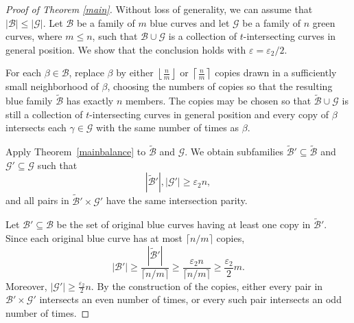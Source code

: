 \documentclass[11pt]{article}
\theoremstyle{plain}
\theoremstyle{definition}
\theoremstyle{remark}
\begin{document}
\begin{proof}[Proof of Theorem \ref{main}]

Without loss of generality, we can assume that $|\mathcal B| \leq |\mathcal G|$.  Let \(\mathcal B\) be a family of \(m\) blue curves and let
\(\mathcal G\) be a family of \(n\) green curves, where \(m\leq n\), such that
\(\mathcal B\cup\mathcal G\) is a collection of \(t\)-intersecting curves in
general position. We show that the conclusion holds with
\(\varepsilon=\varepsilon_2/2\).

For each \(\beta\in\mathcal B\), replace \(\beta\) by either $\left\lfloor \frac{n}{m}\right\rfloor$ or $\left\lceil \frac{n}{m}\right\rceil$ copies drawn in a sufficiently small neighborhood of \(\beta\), choosing the numbers of copies
so that the resulting blue family \(\widetilde{\mathcal B}\) has exactly
\(n\) members. The copies may be chosen so that
\(\widetilde{\mathcal B}\cup\mathcal G\) is still a collection of
\(t\)-intersecting curves in general position and every copy of \(\beta\)
intersects each \(\gamma\in\mathcal G\) with the same number of times as \(\beta\).

Apply Theorem~\ref{mainbalance} to
\(\widetilde{\mathcal B}\) and \(\mathcal G\). We obtain subfamilies
\(\widetilde{\mathcal B}'\subseteq\widetilde{\mathcal B}\) and
\(\mathcal G'\subseteq\mathcal G\) such that
\[
|\widetilde{\mathcal B}'|,|\mathcal G'|\ge \varepsilon_2 n,
\]
and all pairs in
\(\widetilde{\mathcal B}'\times\mathcal G'\) have the same intersection
parity.

Let \(\mathcal B'\subseteq\mathcal B\) be the set of original blue curves
having at least one copy in \(\widetilde{\mathcal B}'\). Since each original
blue curve has at most \(\lceil n/m\rceil\) copies,
\[
|\mathcal B'|
\ge
\frac{|\widetilde{\mathcal B}'|}{\lceil n/m\rceil}
\ge
\frac{\varepsilon_2 n}{\lceil n/m\rceil} \geq \frac{\varepsilon_2}{2}m.
\]
Moreover, $|\mathcal G'|\ge  \frac{\varepsilon_2}{2}n.$  By the construction of the copies, either every pair in
\(\mathcal B'\times\mathcal G'\) intersects an even number of times, or every
such pair intersects an odd number of times.    
\end{proof}
\end{document}
